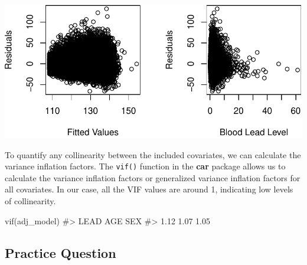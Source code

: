 \documentclass[
  letterpaper,
]{krantz}
\makeatletter
\newenvironment{Shaded}{\begin{snugshade}}{\end{snugshade}}
\newcommand{\AttributeTok}[1]{\textcolor[rgb]{0.40,0.45,0.13}{#1}}
\newcommand{\CommentTok}[1]{\textcolor[rgb]{0.37,0.37,0.37}{#1}}
\newcommand{\DecValTok}[1]{\textcolor[rgb]{0.68,0.00,0.00}{#1}}
\newcommand{\FunctionTok}[1]{\textcolor[rgb]{0.28,0.35,0.67}{#1}}
\newcommand{\NormalTok}[1]{\textcolor[rgb]{0.00,0.23,0.31}{#1}}
\newcommand{\SpecialCharTok}[1]{\textcolor[rgb]{0.37,0.37,0.37}{#1}}
\newcommand{\StringTok}[1]{\textcolor[rgb]{0.13,0.47,0.30}{#1}}
\newenvironment{kframe}{%
\medskip{}
\setlength{\fboxsep}{.8em}
 \def\at@end@of@kframe{}%
 \ifinner\ifhmode%
  \def\at@end@of@kframe{\end{minipage}}%
  \begin{minipage}{\columnwidth}%
 \fi\fi%
 \def\FrameCommand##1{\hskip\@totalleftmargin \hskip-\fboxsep
 \colorbox{shadecolor}{##1}\hskip-\fboxsep
     \hskip-\linewidth \hskip-\@totalleftmargin \hskip\columnwidth}%
 \MakeFramed {\advance\hsize-\width
   \@totalleftmargin\z@ \linewidth\hsize
   \@setminipage}}%
 {\par\unskip\endMakeFramed%
 \at@end@of@kframe}
\renewenvironment{Shaded}{\begin{kframe}}{\end{kframe}}
\makeatother
\begin{document}
\begin{Shaded}
\end{Shaded}

\begin{center}
\includegraphics[width=1\textwidth,height=\textheight]{book/linear_regression_files/figure-pdf/unnamed-chunk-19-1.pdf}
\end{center}

To quantify any collinearity between the included covariates, we can
calculate the variance inflation factors. The \texttt{vif()} function in
the \textbf{car} package allows us to calculate the variance inflation
factors or generalized variance inflation factors for all covariates. In
our case, all the VIF values are around 1, indicating low levels of
collinearity.

\begin{Shaded}
\begin{Highlighting}[]
\FunctionTok{vif}\NormalTok{(adj\_model)}
\CommentTok{\#\textgreater{} LEAD  AGE  SEX }
\CommentTok{\#\textgreater{} 1.12 1.07 1.05}
\end{Highlighting}
\end{Shaded}

\subsection{Practice Question}\label{practice-question-21}
\end{document}
